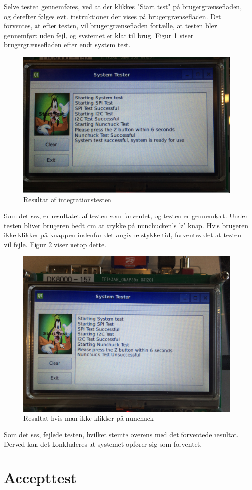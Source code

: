 Selve testen gennemføres, ved at der klikkes "Start test" på brugergrænsefladen, og derefter følges evt. instruktioner der vises på brugergrænsefladen. Det forventes, at efter testen, vil brugergrænsefladen fortælle, at testen blev gennemført uden fejl, og systemet er klar til brug. Figur \ref{figure:integrationstestresult} viser brugergrænsefladen efter endt system test.

\begin{figure}[H]
	\centering
	\includegraphics[width=\textwidth]{Test/images/IntegrationstestProtokoller/resultat2}
	\caption{Resultat af integrationstesten}
	\label{figure:integrationstestresult}
\end{figure}

Som det ses, er resultatet af testen som forventet, og testen er gennemført. Under testen bliver brugeren bedt om at trykke på nunchucken's 'z' knap. Hvis brugeren ikke klikker på knappen indenfor det angivne stykke tid, forventes det at testen vil fejle. Figur \ref{figure:integrationstestresult1} viser netop dette.


\begin{figure}[H]
	\centering
	\includegraphics[width=\textwidth]{Test/images/IntegrationstestProtokoller/resultat1}
	\caption{Resultat hvis man ikke klikker på nunchuck}
	\label{figure:integrationstestresult1}
\end{figure}

Som det ses, fejlede testen, hvilket stemte overens med det forventede resultat. Derved kan det konkluderes at systemet opfører sig som forventet.

\section{Accepttest}